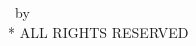 \begin{center}
\vspace*{\fill}
\textcopyright \yourYear\ by \yourName \\*
\MakeUppercase{All Rights Reserved}
\vspace*{\fill}
\end{center}
\clearpage
